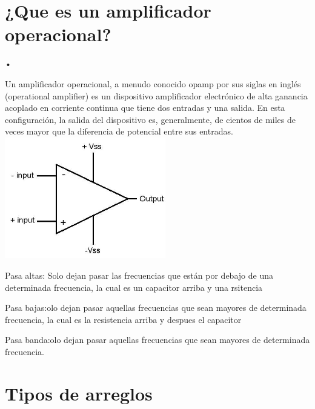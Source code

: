 \documentclass[12pt,a4paper]{article}
\author{leonardo}
\begin{document}
\chapter{¿Que es un amplificador operacional?}
\begin{center}
•

Un amplificador operacional, a menudo conocido opamp por sus siglas en inglés (operational amplifier) es un dispositivo amplificador electrónico de alta ganancia acoplado en corriente continua que tiene dos entradas y una salida. En esta configuración, la salida del dispositivo es, generalmente, de cientos de miles de veces mayor que la diferencia de potencial entre sus entradas.
\includegraphics[width=7cm]{ampli.jpg} 
\end{center}

\begin{flushleft}
 Pasa altas: Solo dejan pasar las frecuencias que están por debajo de una determinada frecuencia, la cual es un capacitor arriba y una rsitencia 
 \end{flushleft} 
\begin{flushleft}
Pasa bajas:olo dejan pasar aquellas frecuencias que sean mayores de determinada frecuencia, la cual es la resistencia arriba y despues el capacitor
\end{flushleft}
\begin{flushleft}
Pasa banda:olo dejan pasar aquellas frecuencias que sean mayores de determinada frecuencia.
\end{flushleft}
\chapter{Tipos de arreglos }
\end{document}
